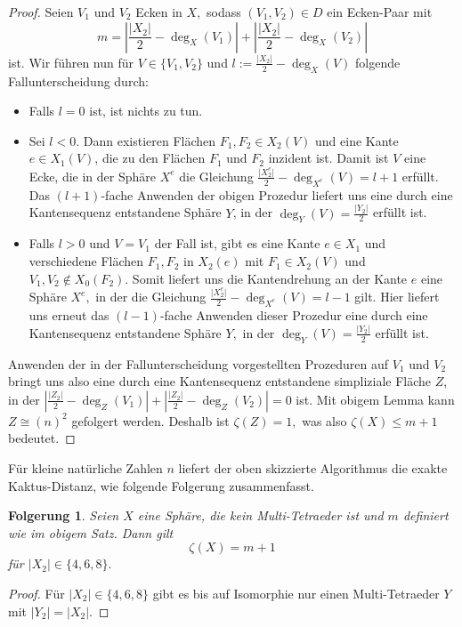 \documentclass[12pt,titlepage,twoside,cleardoublepage]{article}
\theoremstyle{nummermitklammern}
\newtheorem{folgerung}[temp]{Folgerung}
\newtheorem{folgerung}[zahl]{Folgerung}
\numberwithin{equation}{section}
\begin{document}
\begin{proof}
Seien $V_1$ und $V_2$ Ecken in $X,$ sodass $(V_1,V_2)\in D$ ein Ecken-Paar mit 
\[
m=\left|\frac{\vert X_2 \vert}{2}-\deg_X(V_1)\right| +\left| \frac{\vert X_2 \vert}{2}-\deg_X(V_2)\right|
\]
 ist.
Wir führen nun für $V \in \{V_1,V_2\}$ und $l:=\frac{\vert X_2 \vert}{2}-\deg_X(V)$ folgende Fallunterscheidung durch:
\begin{itemize}
\item Falls $l=0$ ist, ist nichts zu tun.
\item Sei $l<0$. Dann existieren Flächen $F_1,F_2 \in X_2(V)$ und eine Kante $e\in X_1(V)$, die zu den Flächen $F_1$ und $F_2$ inzident ist. Damit ist $V$ eine Ecke, die in der Sphäre $X^e$ die Gleichung $\frac{\vert X^e_2\vert }{2}-\deg_{X^e}(V)=l+1$ erfüllt. Das $(l+1)$-fache Anwenden der obigen Prozedur liefert uns eine durch eine Kantensequenz entstandene Sphäre $Y$, in der $\deg_Y(V)=\frac{\vert Y_2\vert }{2}$ erfüllt ist. 
 \item Falls $l>0$ und $V=V_1$ der Fall ist, gibt es eine Kante $e\in X_1$ und verschiedene Flächen $F_1,F_2$ in $X_2(e)$ mit $F_1\in X_2(V)$ und $V_1,V_2 \notin X_0(F_2)$. Somit liefert uns die Kantendrehung an der Kante $e$ eine Sphäre $X^e,$ in der die  Gleichung $\frac{\vert X^e_2\vert }{2}-\deg_{X^e}(V)=l-1$ gilt. Hier liefert uns erneut das $(l-1)$-fache Anwenden dieser Prozedur eine durch eine Kantensequenz entstandene Sphäre $Y,$ in der $\deg_Y(V)=\frac{\vert Y_2\vert }{2}$ erfüllt ist.
\end{itemize}  
 Anwenden der in der Fallunterscheidung vorgestellten Prozeduren auf $V_1$ und $V_2$ bringt uns also eine durch eine Kantensequenz entstandene simpliziale Fläche $Z$, in der $\left|\frac{\vert Z_2 \vert}{2}-\deg_Z(V_1)\right| +\left| \frac{\vert Z_2 \vert}{2}-\deg_Z(V_2)\right|=0$ ist. Mit obigem Lemma kann $Z\cong (n)^2$ gefolgert werden. Deshalb ist $\zeta(Z)=1,$ was also $\zeta(X)\leq m+1$ bedeutet. 
\end{proof}

Für kleine natürliche Zahlen $n$ liefert der oben skizzierte Algorithmus die exakte Kaktus-Distanz, wie folgende Folgerung zusammenfasst. 
\begin{folgerung}
Seien $X$ eine Sphäre, die kein Multi-Tetraeder ist und $m$ definiert wie im obigem Satz. Dann gilt 
\[
\zeta(X)= m+1
\]
 für $\vert X_2 \vert \in \{4,6,8\}.$ 
\end{folgerung}
\begin{proof}
Für $\vert X_2 \vert \in \{4,6,8\}$ gibt es bis auf Isomorphie nur einen Multi-Tetraeder $Y$ mit $\vert Y_2\vert=\vert X_2\vert.$
\end{proof}
\end{document}
